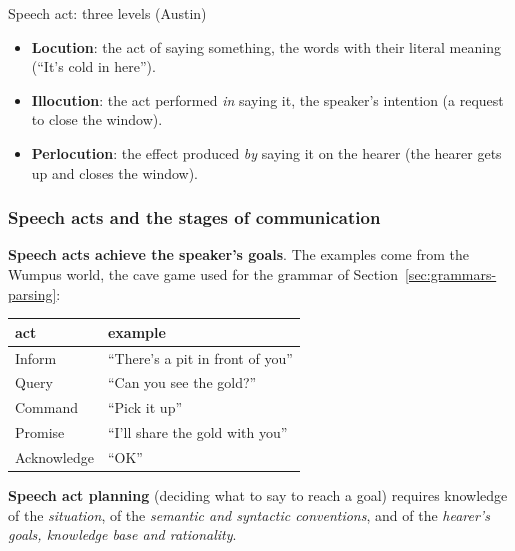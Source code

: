 \notinslides
\begin{nbdef}{Speech act: three levels (Austin)}
\begin{itemize}[nosep]
  \item \textbf{Locution}: the act of saying something, the words with their literal
        meaning (``It's cold in here'').
  \item \textbf{Illocution}: the act performed \emph{in} saying it, the speaker's
        intention (a request to close the window).
  \item \textbf{Perlocution}: the effect produced \emph{by} saying it on the hearer
        (the hearer gets up and closes the window).
\end{itemize}
\end{nbdef}

\subsubsection{Speech acts and the stages of communication}

\begin{center}
\end{center}

\textbf{Speech acts achieve the speaker's goals}. The examples come from the Wumpus world,
the cave game used for the grammar of Section~\ref{sec:grammars-parsing}:
\begin{center}
\small
\begin{tabular}{@{}l l@{}}
\toprule
\textbf{act} & \textbf{example} \\
\midrule
Inform & ``There's a pit in front of you'' \\
Query & ``Can you see the gold?'' \\
Command & ``Pick it up'' \\
Promise & ``I'll share the gold with you'' \\
Acknowledge & ``OK'' \\
\bottomrule
\end{tabular}
\end{center}
\textbf{Speech act planning} (deciding what to say to reach a goal) requires knowledge
of the \emph{situation}, of the \emph{semantic and syntactic conventions}, and of the
\emph{hearer's goals, knowledge base and rationality}.

